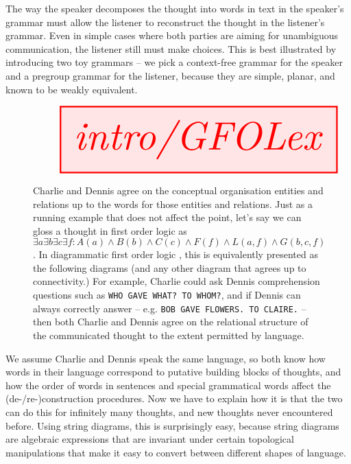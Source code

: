  The way the speaker decomposes the thought into words in text in the speaker's grammar must allow the listener to reconstruct the thought in the listener's grammar. Even in simple cases where both parties are aiming for unambiguous communication, the listener still must make choices. This is best illustrated by introducing two toy grammars -- we pick a context-free grammar for the speaker and a pregroup grammar for the listener, because they are simple, planar, and known to be weakly equivalent.

\begin{figure}[h!]\label{fig:GFOLex}
\centering
\[\resizebox{\textwidth}{!}{\tikzfig{intro/GFOLex}}\]
\caption{Charlie and Dennis agree on the conceptual organisation entities and relations up to the words for those entities and relations. Just as a running example that does not affect the point, let's say we can gloss a thought in first order logic as $\exists a \exists b \exists c \exists f : A(a) \wedge B(b) \wedge C(c) \wedge F(f) \wedge L(a,f) \wedge G(b,c,f)$. In diagrammatic first order logic \citep{haydon_compositional_2020}, this is equivalently presented as the following diagrams (and any other diagram that agrees up to connectivity.) For example, Charlie could ask Dennis comprehension questions such as \texttt{WHO GAVE WHAT? TO WHOM?}, and if Dennis can always correctly answer -- e.g. \texttt{BOB GAVE FLOWERS. TO CLAIRE.} -- then both Charlie and Dennis agree on the relational structure of the communicated thought to the extent permitted by language.}
\end{figure}

We assume Charlie and Dennis speak the same language, so both know how words in their language correspond to putative building blocks of thoughts, and how the order of words in sentences and special grammatical words affect the (de-/re-)construction procedures. Now we have to explain how it is that the two can do this for infinitely many thoughts, and new thoughts never encountered before. Using string diagrams, this is surprisingly easy, because string diagrams are algebraic expressions that are invariant under certain topological manipulations that make it easy to convert between different shapes of language.

